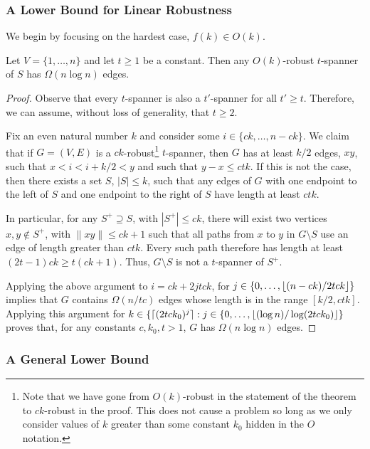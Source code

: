 \documentclass{patmorin}
\begin{document}
\subsubsection{A Lower Bound for Linear Robustness}

We begin by focusing on the hardest case, $f(k) \in O(k)$.

\begin{thm}
  Let $V=\{1,\ldots,n\}$ and let $t\ge 1$ be a constant.  Then any
  $O(k)$-robust $t$-spanner of $S$ has $\Omega(n\log n)$ edges.
\end{thm}

\begin{proof}
  Observe that every $t$-spanner is also a $t'$-spanner for all $t'\ge t$.
  Therefore, we can assume, without loss of generality, that $t\ge 2$.

  Fix an even natural number $k$ and consider some
  $i\in\{ck,\ldots,n-ck\}$.  We claim that if $G=(V,E)$ is a
  $ck$-robust\footnote{Note that we have gone from $O(k)$-robust in the
  statement of the theorem to $ck$-robust in the proof.  This does not
  cause a problem so long as we only consider values of $k$ greater
  than some constant $k_0$ hidden in the $O$ notation.} $t$-spanner,
  then $G$ has at least $k/2$ edges, $xy$, such that $x < i < i+k/2 <
  y$ and such that $y-x \le ctk$.  If this is not the case, then there
  exists a set $S$, $|S|\le k$, such that any edges of $G$ with one
  endpoint to the left of $S$ and one endpoint to the right of $S$
  have length at least $ctk$.

  In particular, for any $S^+\supseteq S$, with $|S^+|\le ck$, there will
  exist two vertices $x,y\not\in S^+$, with $\|xy\|\le ck+1$ such that all
  paths from $x$ to $y$ in $G\setminus S$ use an edge of length greater
  than $ctk$. Every such path therefore has length at least $(2t-1)ck\ge
  t(ck+1)$.  Thus, $G\setminus S$ is not a $t$-spanner of $S^+$.

  Applying the above argument to $i=ck+2jtck$, for
  $j\in\{0,\ldots,{\lfloor (n-ck)/2tck \rfloor}\}$ implies that $G$ contains
  $\Omega(n/tc)$ edges whose length is in the range $[k/2,ctk]$.
  Applying this argument for $k\in\{{\lceil (2tck_0)^{j} \rceil} :
  j\in\{0,\ldots,{\lfloor (\log n)/\log(2tck_0) \rfloor}\}$ proves that, for any
  constants $c,k_0,t>1$, $G$ has $\Omega(n\log n)$ edges.
\end{proof}


\subsubsection{A General Lower Bound}
\end{document}
